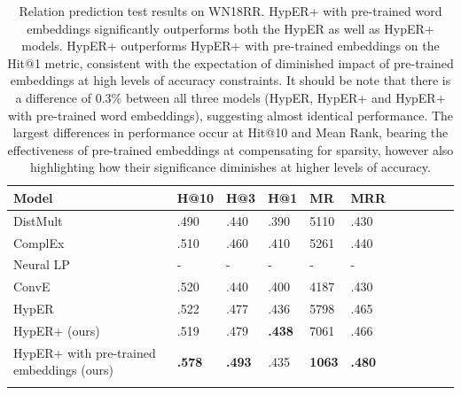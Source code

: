 
\begin{table}
		\centering
		\begin{tabular}{lllllllllll}
  			\textbf{Model} & \textbf{H@10} & \textbf{H@3} & \textbf{H@1} & \textbf{MR} & \textbf{MRR} \\
  			\hline
  			DistMult \unskip~\citep{yang2014embedding} & .490 & .440 & .390 & 5110 & .430 \\
  			ComplEx \unskip~\citep{trouillon2016complex} & .510 & .460 & .410 & 5261 & .440 \\
  			Neural LP \unskip~\citep{yang2017differentiable} & - & - & - & - & - \\
			ConvE \unskip~\citep{dettmers2018convolutional} & .520 & .440 & .400 & 4187 & .430 \\
			HypER \unskip~\citep{balazevic2019hypernetwork} & .522 & .477 & .436 & 5798 & .465 \\
			HypER+ (ours) & .519 & .479 & \textbf{.438} & 7061 & .466 \\
  			\hline
  			HypER+ with pre-trained embeddings (ours) & \textbf{.578} & \textbf{.493} & .435 & \textbf{1063} & \textbf{.480} \\
			&
		\end{tabular}
		\captionsetup{justification=centering}
		\caption{Relation prediction test results on WN18RR. HypER+ with pre-trained word embeddings significantly outperforms both the HypER as well as HypER+ models. HypER+ outperforms HypER+ with pre-trained embeddings on the Hit@1 metric, consistent with the expectation of diminished impact of pre-trained embeddings at high levels of accuracy constraints. It should be note that there is a difference of $ 0.3 \% $ between all three models (HypER, HypER+ and HypER+ with pre-trained word embeddings), suggesting almost identical performance. The largest differences in performance occur at Hit@10 and Mean Rank, bearing the effectiveness of pre-trained embeddings at compensating for sparsity, however also highlighting how their significance diminishes at higher levels of accuracy. }
\end{table}

